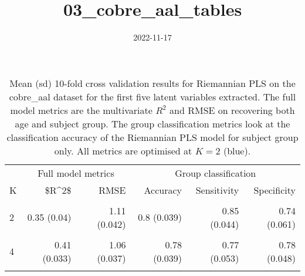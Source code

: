 \documentclass[
]{article}
\title{03\_cobre\_aal\_tables}
\author{}
\date{\vspace{-2.5em}2022-11-17}
\begin{document}
\maketitle

\begin{table}[htbp]

\caption{\label{tab:cobreAalCvResults}Mean (sd) 10-fold cross validation results for Riemannian PLS on the cobre_aal dataset for the first five latent variables extracted.  The full model metrics are the multivariate $R^2$ and RMSE on recovering both age and subject group.  The group classification metrics look at the classification accuracy of the Riemannian PLS model for subject group only.  All metrics are optimised at $K = 2$ (blue).}
\centering
\begin{tabular}[t]{lr>{}r|rrr}
\toprule
\multicolumn{1}{c}{ } & \multicolumn{2}{c}{Full model metrics} & \multicolumn{3}{c}{Group classification} \\
\cmidrule(l{3pt}r{3pt}){2-3} \cmidrule(l{3pt}r{3pt}){4-6}
K & \$R\textasciicircum{}2\$ & RMSE & Accuracy & Sensitivity & Specificity\\
\midrule
\cellcolor{gray!6}{1} & \cellcolor{gray!6}{0.22 (0.033)} & \cellcolor{gray!6}{1.22 (0.034)} & \cellcolor{gray!6}{0.63 (0.037)} & \cellcolor{gray!6}{0.7 (0.045)} & \cellcolor{gray!6}{0.56 (0.055)}\\
2 & 0.35 (0.04) & 1.11 (0.042) & 0.8 (0.039) & 0.85 (0.044) & 0.74 (0.061)\\
\cellcolor{blue!20}{\cellcolor{gray!6}{3}} & \cellcolor{blue!20}{\cellcolor{gray!6}{0.43 (0.034)}} & \cellcolor{blue!20}{\cellcolor{gray!6}{1.04 (0.042)}} & \cellcolor{blue!20}{\cellcolor{gray!6}{0.79 (0.034)}} & \cellcolor{blue!20}{\cellcolor{gray!6}{0.8 (0.049)}} & \cellcolor{blue!20}{\cellcolor{gray!6}{0.78 (0.03)}}\\
4 & 0.41 (0.033) & 1.06 (0.037) & 0.78 (0.039) & 0.77 (0.053) & 0.78 (0.048)\\
\cellcolor{gray!6}{5} & \cellcolor{gray!6}{0.41 (0.032)} & \cellcolor{gray!6}{1.06 (0.036)} & \cellcolor{gray!6}{0.78 (0.039)} & \cellcolor{gray!6}{0.77 (0.053)} & \cellcolor{gray!6}{0.78 (0.048)}\\
\bottomrule
\end{tabular}
\end{table}
\end{document}
